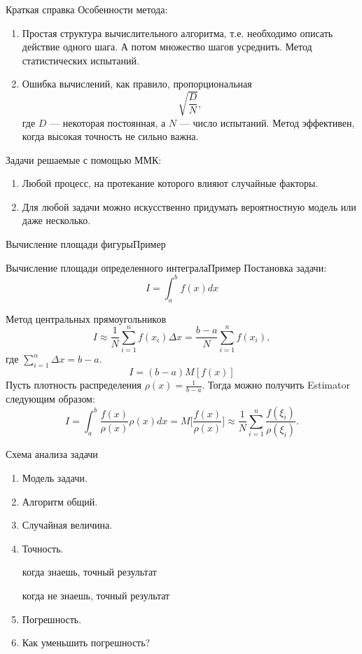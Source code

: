 \documentclass{beamer}
\begin{document}
	\begin{frame}{Краткая справка}
		Особенности метода:
		\begin{enumerate}
			\item 
			Простая структура вычислительного алгоритма, т.е. необходимо описать действие одного шага.
			А потом множество шагов усреднить.
			Метод статистических испытаний.
			\item
			Ошибка вычислений, как правило, пропорциональная 
			$$\sqrt{\frac{D}{N}},$$ 
			где $D$ --- некоторая постоянная, а $N$ --- число испытаний.
			Метод эффективен, когда высокая точность не сильно важна.
			
		\end{enumerate}
		
		Задачи решаемые с помощью ММК:
		\begin{enumerate}
			\item
			Любой процесс, на протекание которого влияют случайные факторы.
			\item 
			Для любой задачи можно искусственно придумать вероятностную модель или даже несколько.
		\end{enumerate}		
	\end{frame}
	
	\begin{frame}{Вычисление площади фигуры}{Пример}
		
		
	\end{frame}
	
	\begin{frame}{Вычисление площади определенного интеграла}{Пример}
		Постановка задачи:
		\[
		I = \int_{a}^{b} f(x) dx
		\]
		
		Метод центральных прямоугольников
		\[
		I 
		\approx 
		\frac{1}{N} \sum_{i=1}^{n} f(x_i) \Delta x 
		=
		\frac{b-a}{N} \sum_{i=1}^{n} f(x_i)
		,
		\]
		где $\sum_{i=1}^{n} \Delta x = b - a$.
		\[
		I
		=
		(b - a) M [f(x)]
		\]
		Пусть плотность распределения $\rho(x) = \frac{1}{b-a}$. Тогда можно получить Estimator следующим образом:
		\[
		I
		= 
		\int_{a}^{b} \frac{f(x)}{\rho(x)} \rho(x) dx
		= 
		M \Bigg[\frac{f(x)}{\rho(x)}\Bigg] 
		\approx
		\frac{1}{N} \sum_{i=1}^{n} \frac{f(\xi_i)}{\rho(\xi_i)}
		.
		\]
	\end{frame}
	
	\begin{frame}{Схема анализа задачи}
		\begin{enumerate}
			\item
			Модель задачи.
			\item
			Алгоритм общий.
			\item
			Случайная величина.
			\item
			Точность.
			
			когда знаешь, точный результат
			
			когда не знаешь, точный результат
			\item
			Погрешность.
			\item
			Как уменьшить погрешность?
		\end{enumerate}
	\end{frame}
			
\end{document}
